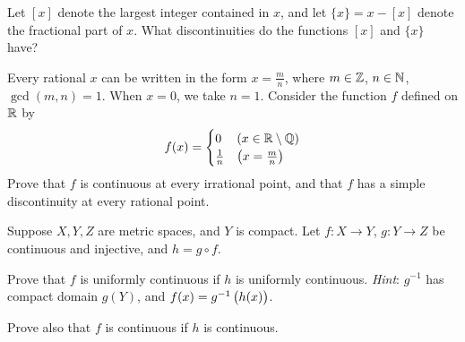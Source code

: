 \begin{exercise}
Let $[x]$ denote the largest integer contained in $x$, and let $\{x\}=x-[x]$ denote the fractional part of $x$. What discontinuities do the functions $[x]$ and $\{x\}$ have? 
\end{exercise}

\begin{exercise}
Every rational $x$ can be written in the form $x=\frac{m}{n}$, where $m\in\mathbb Z$, $n\in\mathbb N$, $\gcd(m,n)=1$. When $x=0$, we take $n=1$. Consider the function $f$ defined on $\mathbb R$ by
\[f(x)=\begin{cases}
0&(x\in\mathbb R\setminus\mathbb Q)\\
\frac{1}{n}&\left(x=\frac{m}{n}\right)
\end{cases}\]
Prove that $f$ is continuous at every irrational point, and that $f$ has a simple discontinuity at every rational point.
\end{exercise}

\begin{exercise}
Suppose $X, Y, Z$ are metric spaces, and $Y$ is compact. Let $f:X\to Y$, $g:Y\to Z$ be continuous and injective, and $h=g\circ f$.

Prove that $f$ is uniformly continuous if $h$ is uniformly continuous. \emph{Hint}: $g^{-1}$ has compact domain $g(Y)$, and $f(x)=g^{-1}\left(h(x)\right)$.

Prove also that $f$ is continuous if $h$ is continuous.
\end{exercise}